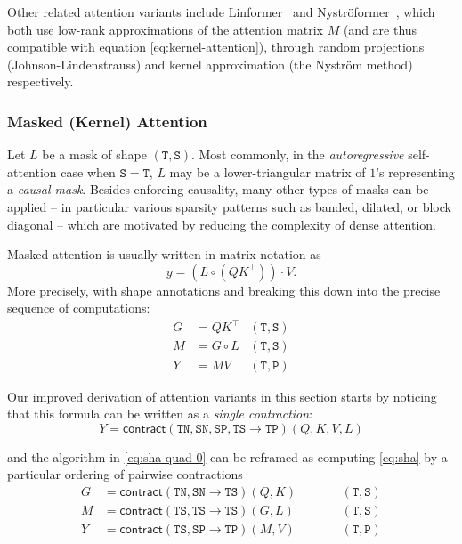 \documentclass{article}
\newcommand{\citep}{\parencite}
\begin{document}
Other related attention variants include Linformer~\citep{wang2020linformer} and Nystr\"{o}former~\citep{xiong2021nystromformer}, which both use low-rank approximations of the attention matrix $M$ (and are thus compatible with equation \eqref{eq:kernel-attention}), through random projections (Johnson-Lindenstrauss) and kernel approximation (the Nystr\"{o}m method) respectively.

\subsubsection{Masked (Kernel) Attention}

Let $L$ be a mask of shape $\mathtt{(T,S)}$.
Most commonly, in the \emph{autoregressive} self-attention case when $\mathtt{S}=\mathtt{T}$,
$L$ may be a lower-triangular matrix of $1$'s representing a \emph{causal mask}.
Besides enforcing causality, many other types of masks can be applied -- in particular various sparsity patterns such as banded, dilated, or block diagonal -- which are motivated by reducing the complexity of dense attention. 

Masked attention is usually written in matrix notation as
\begin{equation}
  \label{eq:sha-quad-matrix}
  y = (L \circ (QK^\top)) \cdot V
  .
\end{equation}
More precisely, with shape annotations and breaking this down into the precise sequence of computations:
\begin{equation}
  \label{eq:sha-quad-0}
  \begin{aligned}
    G &= QK^\top & \mathtt{(T,S)} \\
    M &= G \circ L & \mathtt{(T,S)} \\
    Y &= M V & \mathtt{(T,P)}
  \end{aligned}
\end{equation}

Our improved derivation of attention variants in this section starts by noticing that this formula can be written as a \emph{single contraction}:
\begin{equation}
  \label{eq:sha}
  Y = \mathsf{contract}(\mathtt{TN},\mathtt{SN},\mathtt{SP},\mathtt{TS} \to \mathtt{TP})(Q, K, V, L)
\end{equation}

and the algorithm in \eqref{eq:sha-quad-0} can be reframed as computing \eqref{eq:sha} by a particular ordering of pairwise contractions
\begin{subequations}
  \label{eq:sha-quad}
  \begin{align}
    \label{eq:sha-quad:1}
    G &= \mathsf{contract}(\mathtt{TN, SN} \to \mathtt{TS})(Q, K) && \qquad \mathtt{(T,S)} \\
    \label{eq:sha-quad:2}
    M &= \mathsf{contract}(\mathtt{TS, TS} \to \mathtt{TS})(G, L) && \qquad \mathtt{(T,S)} \\
    \label{eq:sha-quad:3}
    Y &= \mathsf{contract}(\mathtt{TS, SP} \to \mathtt{TP})(M, V) && \qquad \mathtt{(T,P)}
  \end{align}
\end{subequations}
\end{document}
